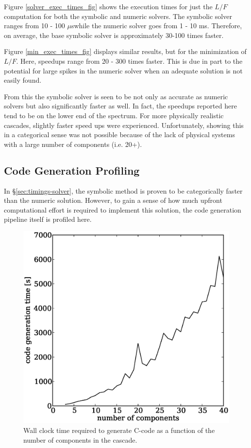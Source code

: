 \documentclass[preprint,12pt]{elsarticle}
\newcommand{\us}[0]{$\mu$s}
\begin{document}
Figure \ref{solver_exec_times_fig} shows the execution times for just the $L/F$ 
computation for both the symbolic and numeric solvers.  The symbolic solver ranges
from 10 - 100 \us while the numeric solver goes from 1 - 10 ms.  Therefore, 
on average, the base symbolic solver is approximately 30-100 times faster.

Figure \ref{min_exec_times_fig} displays similar results, but for the minimization
of $L/F$.  Here, speedups range from 20 - 300 times faster.  This is due in part 
to the potential for large spikes in the numeric solver when an adequate solution 
is not easily found.  

From this the symbolic solver is seen to be not only as accurate as numeric solvers
but also significantly faster as well.  In fact, the speedups reported here tend
to be on the lower end of the spectrum.  For more physically realistic cascades, 
slightly faster speed ups were experienced.  Unfortunately, showing this in a 
categorical sense was not possible because of the lack of physical systems with a
large number of components (i.e. 20+).


\subsection{Code Generation Profiling}
\label{sec:codegen-prof}
In \S\ref{sec:timings-solver}, the symbolic method is proven to be categorically
faster than the numeric solution.  However, to gain a sense of how much upfront 
computational effort is required to implement this solution, the code generation 
pipeline itself is profiled here.

\begin{figure}[htpb]
\begin{center}
\includegraphics[scale=0.5]{codegen_times.eps}
\caption{Wall clock time required to generate C-code as a function of the 
    number of components in the cascade.}
\label{codegen_times_fig}
\end{center}
\end{figure}
\end{document}
